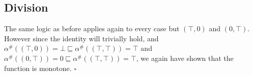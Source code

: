 \documentclass{article}
\begin{document}
\subsection{Division}
The same logic as before applies again to every case but $(\top,0)$ and $(0,\top)$.
However since the identity will trivially hold, and $\alpha^{\#}((\top,0)) = \bot \sqsubseteq \alpha^{\#}((\top,\top)) = \top$ and $\alpha^{\#}((0,\top)) = 0 \sqsubseteq \alpha^{\#}((\top,\top)) = \top$, we again have shown that the function is monotone.  $\square$







\end{document}
